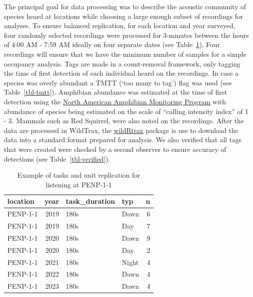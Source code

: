 \documentclass[
  letterpaper,
  DIV=11,
  numbers=noendperiod,
  oneside]{scrartcl}
\begin{document}
The principal goal for data processing was to describe the acoustic
community of species heard at locations while choosing a large enough
subset of recordings for analyses. To ensure balanced replication, for
each location and year surveyed, four randomly selected recordings were
processed for 3-minutes between the hours of 4:00 AM - 7:59 AM ideally
on four separate dates (see Table~\ref{tbl-loc-repl}). Four recordings
will ensure that we have the minimum number of samples for a simple
occupancy analysis. Tags are made in a count-removal framework, only
tagging the time of first detection of each individual heard on the
recordings. In case a species was overly abundant a TMTT (`too many to
tag') flag was used (see Table~\ref{tbl-tmtt}). Amphibian abundance was
estimated at the time of first detection using the
\href{https://www.usgs.gov/centers/eesc/science/north-american-amphibian-monitoring-program}{North
American Amphibian Monitoring Program} with abundance of species being
estimated on the scale of ``calling intensity index'' of 1 - 3. Mammals
such as Red Squirrel, were also noted on the recordings. After the data
are processed in WildTrax, the
\href{https://abbiodiversity.github.io/wildRtrax/}{wildRtrax} package is
use to download the data into a standard format prepared for analysis.
We also verified that all tags that were created were checked by a
second observer to ensure accuracy of detections (see
Table~\ref{tbl-verified}).

\hypertarget{tbl-loc-repl}{}
\begin{table}
\caption{\label{tbl-loc-repl}Example of tasks and unit replication for listening at PENP-1-1 }\tabularnewline

\centering
\begin{tabular}{l|r|l|l|r}
\hline
location & year & task\_duration & typ & n\\
\hline
PENP-1-1 & 2019 & 180s & Dawn & 6\\
\hline
PENP-1-1 & 2019 & 180s & Day & 7\\
\hline
PENP-1-1 & 2020 & 180s & Dawn & 9\\
\hline
PENP-1-1 & 2020 & 180s & Day & 2\\
\hline
PENP-1-1 & 2021 & 180s & Night & 4\\
\hline
PENP-1-1 & 2022 & 180s & Dawn & 4\\
\hline
PENP-1-1 & 2023 & 180s & Dawn & 4\\
\hline
\end{tabular}
\end{table}
\end{document}

